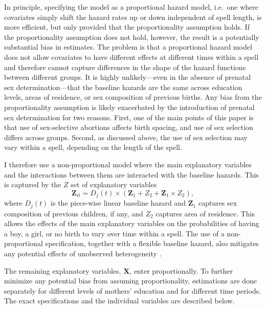 \documentclass[12pt,letterpaper]{article}
\begin{document}
In principle, specifying the model as a proportional hazard model, i.e.\ one 
where covariates simply shift the hazard rates up or down independent of 
spell length, is more efficient, but only provided that the proportionality 
assumption holds.
If the proportionality assumption does not hold, however, the result is
a potentially substantial bias in estimates.
The problem is that a proportional hazard model does not allow covariates
to have different effects at different times within a spell and therefore
cannot capture differences in the shape of the hazard functions between 
different groups. 
It is highly unlikely---even in the absence of prenatal sex determination---that 
the baseline hazards are the same across education levels, areas of residence, 
or sex composition of previous births.
Any bias from the proportionality assumption is likely exacerbated by the 
introduction of prenatal sex determination for two reasons.
First, one of the main points of this paper is that use of sex-selective 
abortions affects birth spacing, and use of sex selection differs across groups.
Second, as discussed above, the use of sex selection may vary within a spell,
depending on the length of the spell.

I therefore use a non-proportional model where the main explanatory variables 
and the interactions between them are interacted with the baseline hazards.
This is captured by the $Z$ set of explanatory variables
\begin{equation}
 \mathbf{Z}_{it} = D_j(t) \times (\mathbf{Z}_1 + Z_2 + \mathbf{Z}_1 \times Z_2),
\end{equation}
where $D_j(t)$ is the piece-wise linear baseline hazard and $\mathbf{Z}_1$ captures sex 
composition of previous children, if any, and $Z_2$ captures area of residence.
This allows the effects of the main explanatory variables on the probabilities 
of having a boy, a girl, or no birth to vary over time within a spell.
The use of a non-proportional specification, together with a flexible baseline hazard, 
also mitigates any potential effects of unobserved heterogeneity \citep{Dolton1995}.

The remaining explanatory variables, $\mathbf{X}$, enter proportionally.
To further minimize any potential bias from assuming proportionality, estimations 
are done separately for different levels of mothers' education and for different 
time periods.
The exact specifications and the individual variables are described below.
\end{document}
